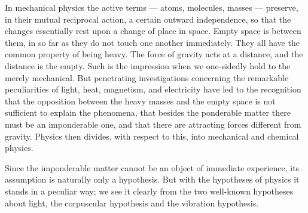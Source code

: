 \documentclass[12pt]{book}
\begin{document}
In mechanical physics the active terms --- atoms, molecules, masses --- preserve, in
their mutual reciprocal action, a certain outward independence, so that the changes
essentially rest upon a change of place in space. Empty space is between them, in so
far as they do not touch one another immediately. They all have the common property of
being heavy. The force of gravity acts at a distance, and the distance is the empty.
Such is the impression when we one-sidedly hold to the merely mechanical. But
penetrating investigations concerning the remarkable peculiarities of light, heat,
magnetism, and electricity have led to the recognition that the opposition between the
heavy masses and the empty space is not sufficient to explain the phenomena, that
besides the ponderable matter there must be an imponderable one, and that there are
attracting forces different from gravity. Physics then divides, with respect to this,
into mechanical and chemical physics.

Since the imponderable matter cannot be an object of immediate experience, its
assumption is naturally only a hypothesis. But with the hypotheses of physics it
stands in a peculiar way; we see it clearly from the two well-known hypotheses about
light, the corpuscular hypothesis and the vibration hypothesis.
\end{document}

